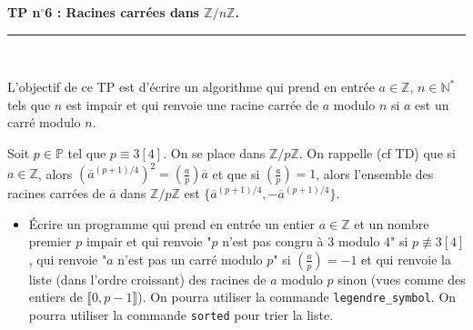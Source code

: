\documentclass[11pt,a4paper]{article}
\title{}
\date{}
\newcommand{\HRule}{\rule{\linewidth}{0.5mm}}
\begin{document}
\pagestyle{fancy}

\fancyhead{}
 \fancyfoot{}


\newcommand{\lb}{\llbracket}
\newcommand{\rb}{\rrbracket}
\newcommand{\N}{\mathbb{N}}
\newcommand{\Z}{\mathbb{Z}}

\newcommand{\md}[3]{#1 \equiv #2 \! \! \! \! \! \pmod {#3} }
\newcommand{\nmd}[3]{#1 \not \equiv #2 \! \! \! \! \!  \pmod #3 }
\newcommand{\mda}[3]{#1 \equiv #2 \! \!  \pmod #3 }
\newcommand{\nmda}[3]{#1 \not \equiv #2 \! \! \pmod #3 }
\newcommand{\mo}[2]{#1 \! \! \! \! \! \pmod #2 }

\thispagestyle{fancy}

\begin{center}
    { \huge \bfseries
    TP n$^{\boldsymbol{\circ}}$6 : Racines carrées dans $\Z/n\Z$.
     \\ [0cm] }
    \HRule \\[0.5cm]
\end{center}

\vspace{0.01cm}

L'objectif de ce TP est d'écrire un algorithme qui prend en entrée $a\in \Z$, $n\in \N^*$ tels que $n$ est impair et qui renvoie une racine carrée de $a$ modulo $n$ si $a$ est un carré modulo $n$.



Soit $p\in \mathbb{P}$ tel que $p\equiv 3 [4]$. On se place dans $\Z/p\Z$. On rappelle (cf TD) que si $a\in \Z$, alors $(\overline{a}^{(p+1)/4})^2=\left(\frac{a}{p}\right)\overline{a}$ et que si $\left(\frac{a}{p}\right)=1$, alors l'ensemble des racines carrées de $\overline{a}$ dans $\Z/p\Z$ est $\{\overline{a}^{(p+1)/4},-\overline{a}^{(p+1)/4}\}$.

\begin{itemize}
\item[•] Écrire un programme qui prend en entrée un entier $a\in \Z$ et un nombre premier $p$ impair et qui renvoie "$p$ n'est pas congru à 3 modulo $4$" si $p\not\equiv 3 [4]$, qui renvoie "$a$ n'est pas un carré modulo $p$" si $\left(\frac{a}{p}\right)=-1$ et qui renvoie la liste (dans l'ordre croissant) des racines de $a$ modulo $p$ sinon (vues comme des entiers de $\llbracket 0,p-1\rrbracket$). On pourra utiliser la commande \texttt{legendre\_symbol}. On pourra utiliser la commande \texttt{sorted} pour trier la liste.
\end{itemize}
\end{document}
